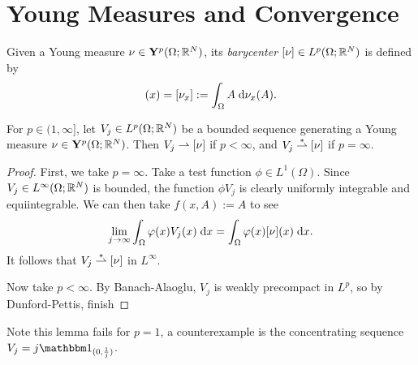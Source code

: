 \section{Young Measures and Convergence}
Given a Young measure $\nu \in \mathbf{Y}^p(\Omega;\mathbb{R}^N)$, its \textit{barycenter} $[\nu] \in L^p(\Omega;\mathbb{R}^N)$ is defined by 
\begin{equation}
    [\nu](x) = [\nu_x] := \int_\Omega A \; \d\nu_x(A).
\end{equation}

\begin{lemma} \label{lem:barycenterConvergence}
    For $p \in (1,\infty]$, let $V_j \in L^p(\Omega;\mathbb{R}^N)$ be a bounded sequence generating a Young measure $\nu \in \mathbf{Y}^p(\Omega;\mathbb{R}^N)$. Then $V_j \rightharpoonup [\nu]$ if $p < \infty$, and $V_j \overset{\ast}{\rightharpoonup} [\nu]$ if $p = \infty$.
\end{lemma}
\begin{proof}
    First, we take $p = \infty$. Take a test function $\phi \in L^1(\Omega)$. Since $V_j \in L^\infty(\Omega;\mathbb{R}^N)$ is bounded, the function $\phi V_j$ is clearly uniformly integrable and equiintegrable. We can then take $f(x,A) := A$ to see 
    \begin{equation}
        \lim_{j \to \infty} \int_\Omega \varphi(x) V_j(x) \; \mathrm{d} x = \int_\Omega \varphi(x) [\nu](x) \; \mathrm{d} x.
    \end{equation}
    It follows that $V_j \overset{\ast}{\rightharpoonup} [\nu]$ in $L^\infty$.

    Now take $p < \infty$. By Banach-Alaoglu, $V_j$ is weakly precompact in $L^p$, so by Dunford-Pettis, {\color{red} finish}
\end{proof}
Note this lemma fails for $p = 1$, a counterexample is the concentrating sequence $V_j = j\bbone_{(0,\frac{1}{j})}$.

